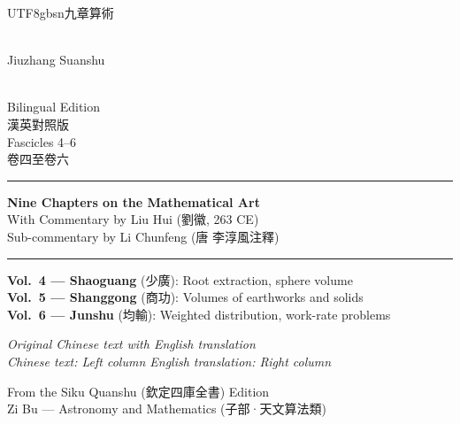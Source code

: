 \documentclass[10pt,a4paper]{article}
\newcommand{\shortline}{\noindent\rule{0.5\textwidth}{0.4pt}\par}
\begin{document}
\begin{titlepage}
\begin{center}
\vspace*{1.5cm}

{\Huge\bfseries\color{titlecolor}
\begin{CJK}{UTF8}{gbsn}九章算術\end{CJK}\\[0.4em]
\large Jiuzhang Suanshu}\\[1.5em]

{\LARGE\color{sectioncolor} Bilingual Edition \\ 漢英對照版}\\[1.5em]

{\Large\color{volcolor} Fascicles 4--6 \\ 卷四至卷六}\\[2em]

\shortline

{\large\bfseries Nine Chapters on the Mathematical Art}\\[0.3em]
{\normalsize With Commentary by Liu Hui (劉徽, 263 CE)}\\[0.2em]
{\footnotesize Sub-commentary by Li Chunfeng (唐 李淳風注釋)}\\[1.5em]

\shortline

\vspace{0.8cm}

\begin{minipage}{0.9\textwidth}
\centering
\textbf{Vol.\ 4 — Shaoguang} (少廣): Root extraction, sphere volume\\[0.2em]
\textbf{Vol.\ 5 — Shanggong} (商功): Volumes of earthworks and solids\\[0.2em]
\textbf{Vol.\ 6 — Junshu} (均輸): Weighted distribution, work-rate problems
\end{minipage}

\vspace{1.5cm}

{\small\textit{Original Chinese text with English translation}}\\[0.3em]
{\small\textit{Chinese text: Left column \quad English translation: Right column}}

\vfill

{\footnotesize From the Siku Quanshu (欽定四庫全書) Edition}\\
{\footnotesize Zi Bu — Astronomy and Mathematics (子部·天文算法類)}

\end{center}
\end{titlepage}
\end{document}
